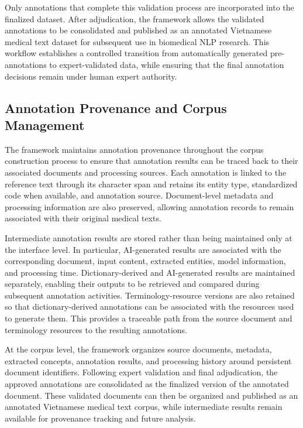 \documentclass[runningheads]{llncs}
\begin{document}
Only annotations that complete this validation process are incorporated into the finalized dataset. After adjudication, the framework allows the validated annotations to be consolidated and published as an annotated Vietnamese medical text dataset for subsequent use in biomedical NLP research. This workflow establishes a controlled transition from automatically generated pre-annotations to expert-validated data, while ensuring that the final annotation decisions remain under human expert authority.

\subsection{Annotation Provenance and Corpus Management}
The framework maintains annotation provenance throughout the corpus construction process to ensure that annotation results can be traced back to their associated documents and processing sources. Each annotation is linked to the reference text through its character span and retains its entity type, standardized code when available, and annotation source. Document-level metadata and processing information are also preserved, allowing annotation records to remain associated with their original medical texts.

Intermediate annotation results are stored rather than being maintained only at the interface level. In particular, AI-generated results are associated with the corresponding document, input content, extracted entities, model information, and processing time. Dictionary-derived and AI-generated results are maintained separately, enabling their outputs to be retrieved and compared during subsequent annotation activities. Terminology-resource versions are also retained so that dictionary-derived annotations can be associated with the resources used to generate them. This provides a traceable path from the source document and terminology resources to the resulting annotations.

At the corpus level, the framework organizes source documents, metadata, extracted concepts, annotation results, and processing history around persistent document identifiers. Following expert validation and final adjudication, the approved annotations are consolidated as the finalized version of the annotated document. These validated documents can then be organized and published as an annotated Vietnamese medical text corpus, while intermediate results remain available for provenance tracking and future analysis.
\end{document}
